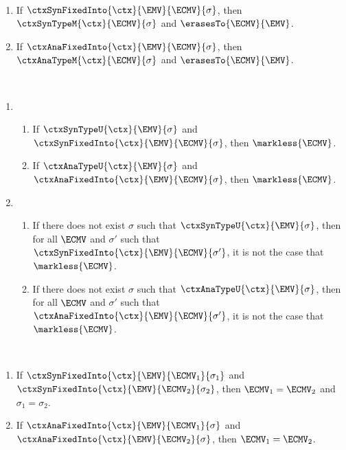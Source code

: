 \begin{theorem}[name=Marking Well-Formedness] \
  \begin{enumerate}
    \item If $\ctxSynFixedInto{\ctx}{\EMV}{\ECMV}{\sigma}$, then $\ctxSynTypeM{\ctx}{\ECMV}{\sigma}$ and
      $\erasesTo{\ECMV}{\EMV}$.
    \item If $\ctxAnaFixedInto{\ctx}{\EMV}{\ECMV}{\sigma}$, then $\ctxAnaTypeM{\ctx}{\ECMV}{\sigma}$ and
      $\erasesTo{\ECMV}{\EMV}$.
  \end{enumerate}
\end{theorem}

\begin{theorem}[name=Marking of Well-Typed/Ill-Typed Expressions] \
  \begin{enumerate}
    \item \begin{enumerate}
        \item If $\ctxSynTypeU{\ctx}{\EMV}{\sigma}$ and $\ctxSynFixedInto{\ctx}{\EMV}{\ECMV}{\sigma}$,
          then $\markless{\ECMV}$.
        \item If $\ctxAnaTypeU{\ctx}{\EMV}{\sigma}$ and $\ctxAnaFixedInto{\ctx}{\EMV}{\ECMV}{\sigma}$,
          then $\markless{\ECMV}$.
      \end{enumerate}

    \item \begin{enumerate}
        \item If there does not exist $\sigma$ such that $\ctxSynTypeU{\ctx}{\EMV}{\sigma}$, then for
          all $\ECMV$ and $\sigma'$ such that $\ctxSynFixedInto{\ctx}{\EMV}{\ECMV}{\sigma'}$, it is not
          the case that $\markless{\ECMV}$.
        \item If there does not exist $\sigma$ such that $\ctxAnaTypeU{\ctx}{\EMV}{\sigma}$, then for
          all $\ECMV$ and $\sigma'$ such that $\ctxAnaFixedInto{\ctx}{\EMV}{\ECMV}{\sigma'}$, it is not
          the case that $\markless{\ECMV}$.
      \end{enumerate}
  \end{enumerate}
\end{theorem}

\begin{theorem}[name=Marking Unicity] \
  \begin{enumerate}
    \item If $\ctxSynFixedInto{\ctx}{\EMV}{\ECMV_1}{\sigma_1}$ and
      $\ctxSynFixedInto{\ctx}{\EMV}{\ECMV_2}{\sigma_2}$, then $\ECMV_1 = \ECMV_2$ and $\sigma_1 =
      \sigma_2$.
    \item If $\ctxAnaFixedInto{\ctx}{\EMV}{\ECMV_1}{\sigma}$ and
      $\ctxAnaFixedInto{\ctx}{\EMV}{\ECMV_2}{\sigma}$, then $\ECMV_1 = \ECMV_2$.
  \end{enumerate}
\end{theorem}